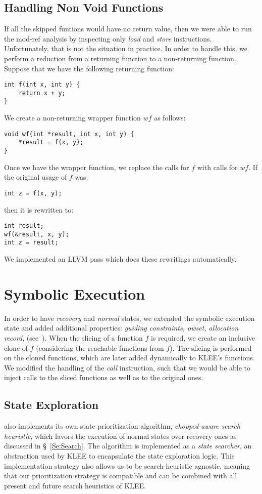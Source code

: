\subsection{Handling Non Void Functions}
If all the skipped funtions would have no return value,
then we were able to run the mod-ref analysis by inspecting only \textit{load} and \textit{store} instructions.
Unfortunately, that is not the situation in practice.
In order to handle this, we perform a reduction from a returning function to a non-returning function.
Suppose that we have the following returning function:
\begin{lstlisting}[linewidth=.4\textwidth,numbers=none]
int f(int x, int y) {
    return x + y;
}
\end{lstlisting}
\label{fig:ret2void-original}
We create a non-returning wrapper function $wf$ as follows:
\begin{lstlisting}[linewidth=.4\textwidth,numbers=none]
void wf(int *result, int x, int y) {
    *result = f(x, y);
}
\end{lstlisting}
\label{fig:ret2void-original}
Once we have the wrapper function, we replace the calls for $f$ with calls for $wf$.
If the original usage of $f$ was:
\begin{lstlisting}[linewidth=.4\textwidth,numbers=none]
int z = f(x, y);
\end{lstlisting}
then it is rewritten to:
\begin{lstlisting}[linewidth=.4\textwidth,numbers=none]
int result;
wf(&result, x, y);
int z = result;
\end{lstlisting}
We implemented an LLVM pass which does these rewritings automatically.

\section{Symbolic Execution}
In order to have \textit{recovery} and \textit{normal} states,
we extended the symbolic execution state
and added additional properties: \textit{guiding constraints, owset, allocation record}, \etc (see~).
When the slicing of a function $f$ is required,
we create an inclusive clone of $f$ (considering the reachable functions from $f$).
The slicing is performed on the cloned functions, which are later added dynamically to KLEE's functions.
We modified the handling of the \textit{call} instruction,
such that we would be able to inject calls to the sliced functions as well as to the original ones.


\subsection{State Exploration}
\toolname also implements its own state
prioritization algorithm, \textit{chopped-aware search heuristic},
which favors the execution of normal states over recovery ones as
discussed in \S~\ref{Se:Search}. The algorithm is implemented as a
\textit{state searcher}, an abstraction used by KLEE to encapsulate
the state exploration logic. This implementation strategy also allows
us to be search-heuristic agnostic, meaning that our prioritization
strategy is compatible and can be combined with all present and future
search heuristics of KLEE.

